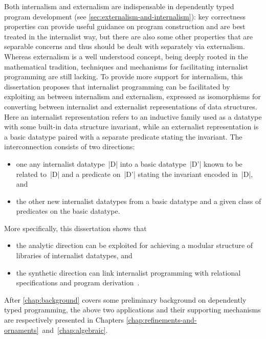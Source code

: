 Both internalism and externalism are indispensable in dependently typed program development (see \autoref{sec:externalism-and-internalism}): key correctness properties can provide useful guidance on program construction and are best treated in the internalist way, but there are also some other properties that are separable concerns and thus should be dealt with separately via externalism.
Whereas externalism is a well understood concept, being deeply rooted in the mathematical tradition, techniques and mechanisms for facilitating internalist programming are still lacking.
To provide more support for internalism, this dissertation proposes that internalist programming can be facilitated by exploiting an  between internalism and externalism, expressed as isomorphisms for converting between internalist and externalist representations of data structures.
Here an internalist representation refers to an inductive family used as a datatype with some built-in data structure invariant, while an externalist representation is a basic datatype paired with a separate predicate stating the invariant.
The interconnection consists of two directions:
\begin{itemize}
\item one  any internalist datatype~|D| into a basic datatype~|D'| known to be related to~|D| and a predicate on~|D'| stating the invariant encoded in~|D|, and
\item the other  new internalist datatypes from a basic datatype and a given class of predicates on the basic datatype.
\end{itemize}
More specifically, this dissertation shows that
\begin{itemize}
\item the analytic direction can be exploited for achieving a modular structure of libraries of internalist datatypes, and
\item the synthetic direction can link internalist programming with relational specifications and program derivation~\citep{Bird-AoP}.
\end{itemize}
After \autoref{chap:background} covers some preliminary background on dependently typed programming, the above two applications and their supporting mechanisms are respectively presented in Chapters \ref{chap:refinements-and-ornaments}~and~\ref{chap:algebraic}.
